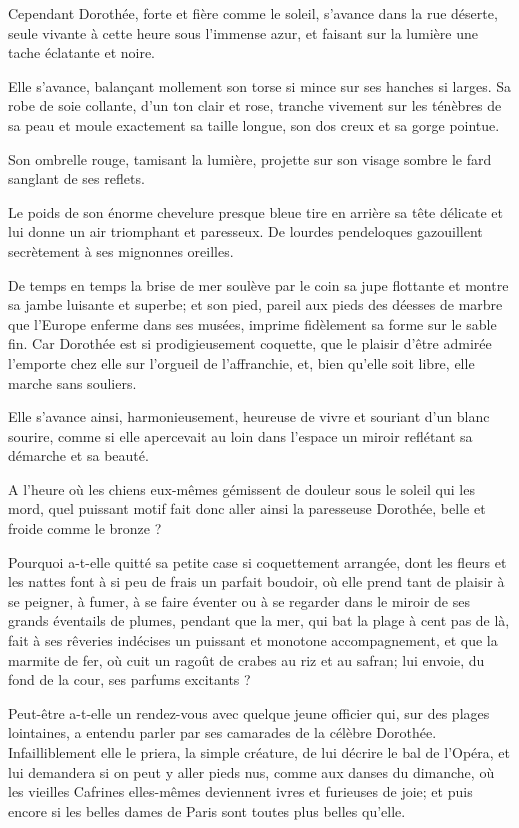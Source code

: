 Cependant Dorothée, forte et fière comme le soleil,
s’avance dans la rue déserte, seule vivante à cette
heure sous l’immense azur, et faisant sur la lumière
une tache éclatante et noire.

Elle s’avance, balançant mollement son torse si mince
sur ses hanches si larges. Sa robe de soie collante,
d’un ton clair et rose, tranche vivement sur les
ténèbres de sa peau et moule exactement sa taille longue, son dos creux
et sa gorge pointue.

Son ombrelle rouge, tamisant la lumière, projette sur son visage sombre
le fard sanglant de ses reflets.

Le poids de son énorme chevelure presque bleue tire en arrière sa tête
délicate et lui donne un air triomphant et paresseux. De lourdes
pendeloques gazouillent secrètement à ses mignonnes oreilles.

De temps en temps la brise de mer soulève par le coin sa jupe flottante
et montre sa jambe luisante et superbe; et son pied, pareil aux pieds
des déesses de marbre que l’Europe enferme dans ses
musées, imprime fidèlement sa forme sur le sable fin. Car Dorothée est
si prodigieusement coquette, que le plaisir d’être
admirée l’emporte chez elle sur
l’orgueil de l’affranchie, et, bien
qu’elle soit libre, elle marche sans souliers.

Elle s’avance ainsi, harmonieusement, heureuse de vivre
et souriant d’un blanc sourire, comme si elle
apercevait au loin dans l’espace un miroir reflétant
sa démarche et sa beauté.

A l’heure où les chiens eux{}-mêmes gémissent de
douleur sous le soleil qui les mord, quel puissant motif fait donc
aller ainsi la paresseuse Dorothée, belle et froide comme le bronze ?

Pourquoi a{}-t{}-elle quitté sa petite case si coquettement arrangée,
dont les fleurs et les nattes font à si peu de frais un parfait
boudoir, où elle prend tant de plaisir à se peigner, à fumer, à se
faire éventer ou à se regarder dans le miroir de ses grands éventails
de plumes, pendant que la mer, qui bat la plage à cent pas de là, fait
à ses rêveries indécises un puissant et monotone accompagnement, et que
la marmite de fer, où cuit un ragoût de crabes au riz et au safran; lui
envoie, du fond de la cour, ses parfums excitants ?

Peut{}-être a{}-t{}-elle un rendez{}-vous avec quelque jeune officier
qui, sur des plages lointaines, a entendu parler par ses camarades de
la célèbre Dorothée. Infailliblement elle le priera, la simple
créature, de lui décrire le bal de l’Opéra, et lui
demandera si on peut y aller pieds nus, comme aux danses du dimanche,
où les vieilles Cafrines elles{}-mêmes deviennent ivres et furieuses de
joie; et puis encore si les belles dames de Paris sont toutes plus
belles qu’elle.

